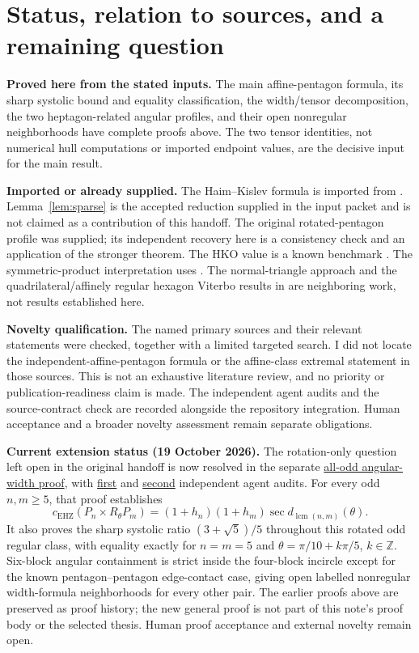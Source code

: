 \documentclass[11pt,a4paper]{article}
\theoremstyle{definition}\newtheorem{definition}[theorem]{Definition}
\theoremstyle{remark}\newtheorem{remark}[theorem]{Remark}
\newcommand{\capc}{c_{\mathrm{EHZ}}}
\begin{document}
\section{Status, relation to sources, and a remaining question}\label{sec:status}
\textbf{Proved here from the stated inputs.} The main affine-pentagon formula, its sharp systolic bound and equality classification, the width/tensor decomposition, the two heptagon-related angular profiles, and their open nonregular neighborhoods have complete proofs above. The two tensor identities, not numerical hull computations or imported endpoint values, are the decisive input for the main result.

\textbf{Imported or already supplied.} The Haim--Kislev formula is imported from \cite{HK}. Lemma~\ref{lem:sparse} is the accepted reduction supplied in the input packet and is not claimed as a contribution of this handoff. The original rotated-pentagon profile was supplied; its independent recovery here is a consistency check and an application of the stronger theorem. The HKO value is a known benchmark \cite{HKO}. The symmetric-product interpretation uses \cite{AAKO}. The normal-triangle approach and the quadrilateral/affinely regular hexagon Viterbo results in \cite{BMP} are neighboring work, not results established here.

\textbf{Novelty qualification.} The named primary sources and their relevant statements were checked, together with a limited targeted search. I did not locate the independent-affine-pentagon formula or the affine-class extremal statement in those sources. This is not an exhaustive literature review, and no priority or publication-readiness claim is made. The independent agent audits and the source-contract check are recorded alongside the repository integration. Human acceptance and a broader novelty assessment remain separate obligations.

\textbf{Current extension status (19 October 2026).} The rotation-only question
left open in the original handoff is now resolved in the separate
\href{odd-regular-angular-width.md}{all-odd angular-width proof}, with
\href{odd-regular-angular-width-audit.md}{first} and
\href{odd-regular-angular-width-second-audit.md}{second} independent agent audits.
For every odd $n,m\ge5$, that proof establishes
\[
 \capc(P_n\times R_\theta P_m)
 =(1+h_n)(1+h_m)\sec d_{\operatorname{lcm}(n,m)}(\theta).
\]
It also proves the sharp systolic ratio $(3+\sqrt5)/5$ throughout this rotated
odd regular class, with equality exactly for $n=m=5$ and
$\theta=\pi/10+k\pi/5$, $k\in\mathbb Z$. Six-block angular containment is strict
inside the four-block incircle except for the known pentagon--pentagon
edge-contact case, giving open labelled nonregular width-formula neighborhoods
for every other pair. The earlier proofs above are preserved as proof history;
the new general proof is not part of this note's proof body or the selected
thesis. Human proof acceptance and external novelty remain open.
\end{document}
